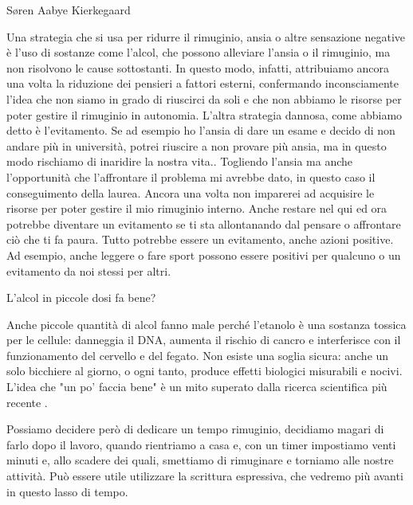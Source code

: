 \documentclass[12pt]{book} %
\begin{document}
Søren Aabye Kierkegaard

Una strategia che si usa per ridurre il rimuginio, ansia o altre sensazione negative è l'uso di sostanze come l'alcol,
che possono alleviare l’ansia o il rimuginio, ma non risolvono le cause sottostanti.
In questo modo, infatti, attribuiamo ancora una volta la riduzione dei pensieri a fattori esterni, confermando
inconsciamente l'idea che non siamo in grado di riuscirci da soli e che non abbiamo le risorse per
poter gestire il rimuginio in autonomia. L'altra strategia dannosa, come abbiamo detto è
l'evitamento. Se ad esempio ho l'ansia di dare un esame e decido di non andare più in università, potrei riuscire a non provare più ansia, ma in questo modo rischiamo di inaridire la nostra vita.. Togliendo
l'ansia ma anche l'opportunità che l'affrontare il problema mi avrebbe dato, in questo caso il conseguimento della
laurea. Ancora una volta non imparerei ad acquisire le risorse per poter gestire il mio rimuginio interno.
Anche restare nel qui ed ora potrebbe diventare un evitamento se ti sta allontanando dal pensare o affrontare ciò che ti fa paura. 
Tutto potrebbe essere un evitamento, anche azioni positive. Ad esempio, anche leggere o fare sport possono essere positivi per qualcuno o un evitamento da noi stessi per altri.

\begin{mdframed}[linewidth=1pt]
L'alcol in piccole dosi fa bene?

Anche piccole quantità di alcol fanno male perché l’etanolo è una sostanza tossica per le cellule: danneggia il DNA, aumenta il rischio di cancro e interferisce con il funzionamento del cervello e del fegato. Non esiste una soglia sicura: anche un solo bicchiere al giorno, o ogni tanto, produce effetti biologici misurabili e nocivi. L’idea che "un po’ faccia bene" è un mito superato dalla ricerca scientifica più recente   .
\end{mdframed}

Possiamo decidere però di dedicare un tempo rimuginio, decidiamo magari di farlo dopo il lavoro, quando rientriamo a
casa e, con un timer impostiamo venti minuti e, allo scadere dei quali, smettiamo di rimuginare e torniamo alle nostre
attività. Può essere utile utilizzare la scrittura espressiva, che vedremo più avanti in questo lasso di tempo.
\end{document}
